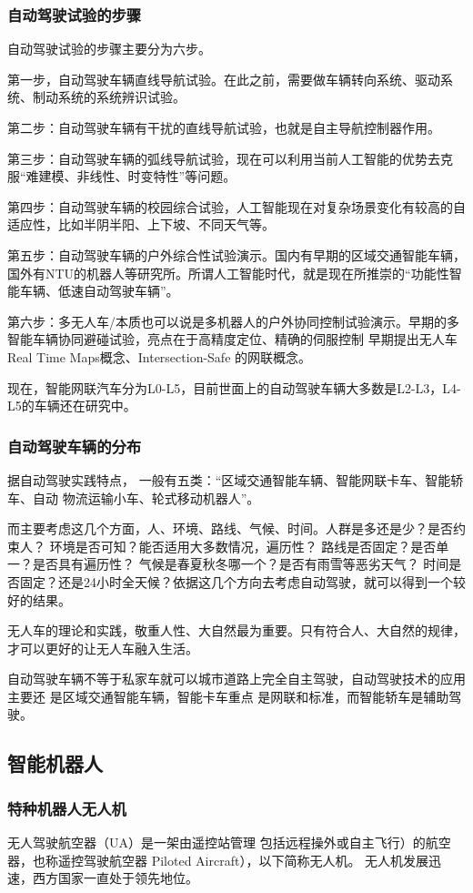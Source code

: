 \documentclass[12pt,a4paper,oneside]{article}
\begin{document}
\subsubsection{自动驾驶试验的步骤}
自动驾驶试验的步骤主要分为六步。

第一步，自动驾驶车辆直线导航试验。在此之前，需要做车辆转向系统、驱动系统、制动系统的系统辨识试验。

第二步：自动驾驶车辆有干扰的直线导航试验，也就是自主导航控制器作用。

第三步：自动驾驶车辆的弧线导航试验，现在可以利用当前人工智能的优势去克服“难建模、非线性、时变特性”等问题。

第四步：自动驾驶车辆的校园综合试验，人工智能现在对复杂场景变化有较高的自适应性，比如半阴半阳、上下坡、不同天气等。

第五步：自动驾驶车辆的户外综合性试验演示。国内有早期的区域交通智能车辆，国外有NTU的机器人等研究所。所谓人工智能时代，就是现在所推崇的“功能性智能车辆、低速自动驾驶车辆”。

第六步：多无人车/本质也可以说是多机器人的户外协同控制试验演示。早期的多智能车辆协同避碰试验，亮点在于高精度定位、精确的伺服控制
早期提出无人车Real Time Maps概念、Intersection-Safe 的网联概念。

现在，智能网联汽车分为L0-L5，目前世面上的自动驾驶车辆大多数是L2-L3，L4-L5的车辆还在研究中。
\subsubsection{自动驾驶车辆的分布}
据自动驾驶实践特点，
一般有五类：“区域交通智能车辆、智能网联卡车、智能轿车、自动
物流运输小车、轮式移动机器人”。

而主要考虑这几个方面，人、环境、路线、气候、时间。人群是多还是少？是否约束人？
环境是否可知？能否适用大多数情况，遍历性？
路线是否固定？是否单一？是否具有遍历性？
气候是春夏秋冬哪一个？是否有雨雪等恶劣天气？
时间是否固定？还是24小时全天候？依据这几个方向去考虑自动驾驶，就可以得到一个较好的结果。

无人车的理论和实践，敬重人性、大自然最为重要。只有符合人、大自然的规律，才可以更好的让无人车融入生活。

自动驾驶车辆不等于私家车就可以城市道路上完全自主驾驶，自动驾驶技术的应用主要还
是区域交通智能车辆，智能卡车重点
是网联和标准，而智能轿车是辅助驾驶。
\subsection{智能机器人}
\subsubsection{特种机器人无人机}
无人驾驶航空器（UA）是一架由遥控站管理
包括远程操外或自主飞行）的航空器，也称遥控驾驶航空器
Piloted Aircraft），以下简称无人机。
无人机发展迅速，西方国家一直处于领先地位。
\end{document}
